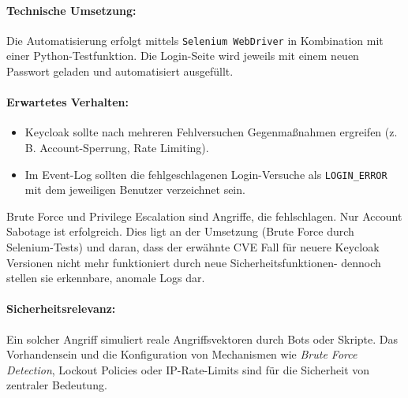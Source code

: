 \documentclass[a4paper,12pt]{article}
\begin{document}
	\paragraph{Technische Umsetzung:}
	Die Automatisierung erfolgt mittels \texttt{Selenium WebDriver} in Kombination mit einer Python-Testfunktion. Die Login-Seite wird jeweils mit einem neuen Passwort geladen und automatisiert ausgefüllt.
	
	\paragraph{Erwartetes Verhalten:}
	\begin{itemize}
		\item Keycloak sollte nach mehreren Fehlversuchen Gegenmaßnahmen ergreifen (z.\,B. Account-Sperrung, Rate Limiting).
		\item Im Event-Log sollten die fehlgeschlagenen Login-Versuche als \texttt{LOGIN\_ERROR} mit dem jeweiligen Benutzer verzeichnet sein.
	\end{itemize}
	Brute Force und Privilege Escalation sind Angriffe, die fehlschlagen. Nur Account Sabotage ist erfolgreich. Dies ligt an der Umsetzung (Brute Force durch Selenium-Tests) und daran, dass der erwähnte CVE Fall für neuere Keycloak Versionen nicht mehr funktioniert durch neue Sicherheitsfunktionen- dennoch stellen sie erkennbare, anomale Logs dar.
	
	\paragraph{Sicherheitsrelevanz:}
	Ein solcher Angriff simuliert reale Angriffsvektoren durch Bots oder Skripte. Das Vorhandensein und die Konfiguration von Mechanismen wie \textit{Brute Force Detection}, Lockout Policies oder IP-Rate-Limits sind für die Sicherheit von zentraler Bedeutung.
\end{document}
